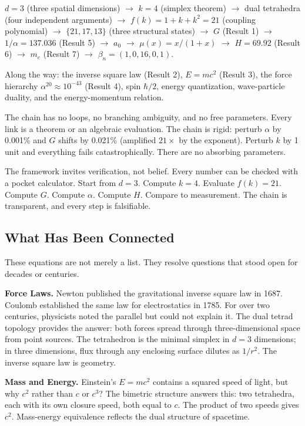 \documentclass[aps,prd,preprint,superscriptaddress,showpacs,preprintnumbers,amsmath,amssymb,nofootinbib]{revtex4-2}
\begin{document}
$d = 3$ (three spatial dimensions) $\to$ $k = 4$ (simplex theorem) $\to$ dual tetrahedra (four independent arguments) $\to$ $f(k) = 1 + k + k^2 = 21$ (coupling polynomial) $\to$ $\{21, 17, 13\}$ (three structural states) $\to$ $G$ (Result 1) $\to$ $1/\alpha = 137.036$ (Result 5) $\to$ $a_0$ $\to$ $\mu(x) = x/(1+x)$ $\to$ $H = 69.92$ (Result 6) $\to$ $m_e$ (Result 7) $\to$ $\beta_n = (1, 0, 16, 0, 1)$.

Along the way: the inverse square law (Result 2), $E = mc^2$ (Result 3), the force hierarchy $\alpha^{20} \approx 10^{-43}$ (Result 4), spin $\hbar/2$, energy quantization, wave-particle duality, and the energy-momentum relation.

The chain has no loops, no branching ambiguity, and no free parameters. Every link is a theorem or an algebraic evaluation. The chain is rigid: perturb $\alpha$ by 0.001\% and $G$ shifts by 0.021\% (amplified $21\times$ by the exponent). Perturb $k$ by 1 unit and everything fails catastrophically. There are no absorbing parameters.

The framework invites verification, not belief. Every number can be checked with a pocket calculator. Start from $d = 3$. Compute $k = 4$. Evaluate $f(k) = 21$. Compute $G$. Compute $\alpha$. Compute $H$. Compare to measurement. The chain is transparent, and every step is falsifiable.

\subsection{What Has Been Connected}
\label{subsec:connections}

These equations are not merely a list. They resolve questions that stood open for decades or centuries.

\textbf{Force Laws.} Newton published the gravitational inverse square law in 1687. Coulomb established the same law for electrostatics in 1785. For over two centuries, physicists noted the parallel but could not explain it. The dual tetrad topology provides the answer: both forces spread through three-dimensional space from point sources. The tetrahedron is the minimal simplex in $d = 3$ dimensions; in three dimensions, flux through any enclosing surface dilutes as $1/r^2$. The inverse square law is geometry.

\textbf{Mass and Energy.} Einstein's $E = mc^2$ contains a squared speed of light, but why $c^2$ rather than $c$ or $c^3$? The bimetric structure answers this: two tetrahedra, each with its own closure speed, both equal to $c$. The product of two speeds gives $c^2$. Mass-energy equivalence reflects the dual structure of spacetime.
\end{document}
